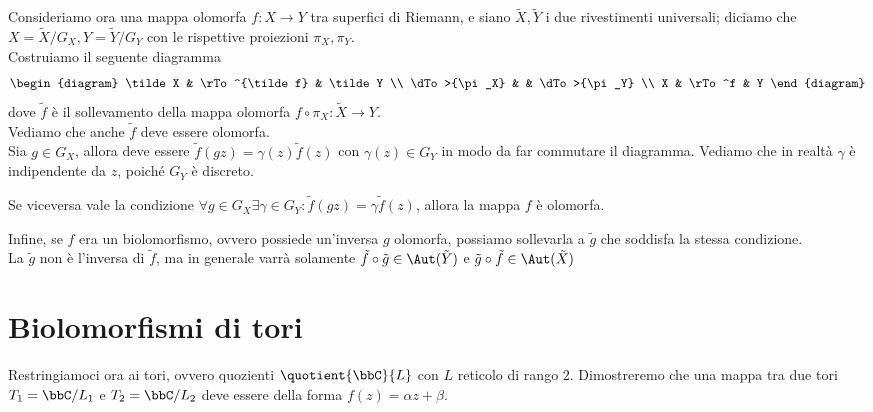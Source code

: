 Consideriamo ora una mappa olomorfa $f:X\to Y$ tra superfici di Riemann, e siano $\tilde X,\tilde Y$ i due rivestimenti universali; diciamo che $X=\tilde X / G_X,Y=\tilde Y / G_Y$ con le rispettive proiezioni $\pi_X,\pi_Y$.\\
Costruiamo il seguente diagramma
\[
    \begin{diagram}
        \tilde X  		& \rTo^{\tilde f} 	& \tilde Y 		 	\\
        \dTo>{\pi_X}	&					& \dTo>{\pi_Y}		\\
        X   			& \rTo^f 			& Y
    \end{diagram}
\]
dove $\tilde f$ è il sollevamento della mappa olomorfa $f\circ\pi_X:\tilde X\to Y$.\\
Vediamo che anche $\tilde f$ deve essere olomorfa.\\
Sia $g\in G_X$, allora deve essere $\tilde f(gz)=\gamma(z)\tilde f(z)$ con $\gamma(z)\in G_Y$ in modo da far commutare il diagramma. Vediamo che in realtà $\gamma$ è indipendente da $z$, poiché $G_Y$ è discreto.\\
\begin{osservazione}
    Se viceversa vale la condizione $\forall g\in G_X\exists\gamma\in G_Y: \tilde f(gz)=\gamma\tilde f(z)$, allora la mappa $f$ è olomorfa.
\end{osservazione}

Infine, se $f$ era un biolomorfismo, ovvero possiede un'inversa $g$ olomorfa, possiamo sollevarla a $\tilde g$ che soddisfa la stessa condizione.\\
 La $\tilde g$ non è l'inversa di $\tilde f$, ma in generale varrà solamente $\tilde f\circ\tilde g\in\Aut(\tilde Y)$ e $\tilde g\circ\tilde f\in\Aut(\tilde X)$




\section{Biolomorfismi di tori}
Restringiamoci ora ai tori, ovvero quozienti $\quotient{\bbC}{L}$ con $L$ reticolo di rango $2$. Dimostreremo che una mappa tra due tori $T_1 = \bbC/L_1$ e $T_2 = \bbC/L_2$ deve essere della forma $f(z)=\alpha z + \beta$.


